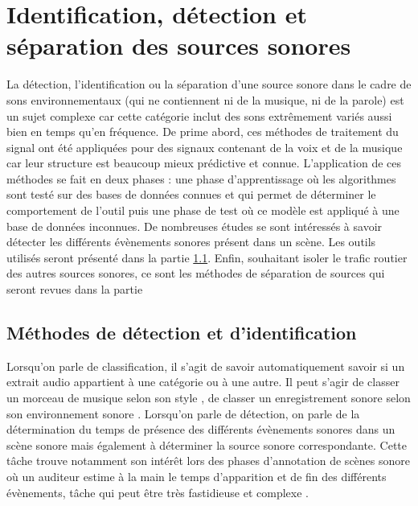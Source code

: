 %
%
%
%
%

\chapter{Identification, détection et séparation des sources sonores}

La détection, l'identification ou la séparation d'une source sonore dans le cadre de sons environnementaux (qui ne contiennent ni de la musique, ni de la parole) est un sujet complexe car cette catégorie inclut des sons extrêmement variés aussi bien en temps qu'en fréquence. De prime abord, ces méthodes de traitement du signal ont été appliquées pour des signaux contenant de la voix et de la musique car leur structure est beaucoup mieux prédictive et connue. L'application de ces méthodes se fait en deux phases : une phase d'apprentissage où les algorithmes sont testé sur des bases de données connues et qui permet de déterminer le comportement de l'outil puis une phase de test où ce modèle est appliqué à une base de données inconnues. De nombreuses études se sont intéressés à savoir détecter les différents évènements sonores présent dans un scène. Les outils utilisés seront présenté dans la partie \ref{sec:ident_detec}. Enfin, souhaitant isoler le trafic routier des autres sources sonores, ce sont les méthodes de séparation de sources qui seront revues dans la partie

\section{Méthodes de détection et d'identification}
\label{sec:ident_detec}

Lorsqu'on parle de classification, il s'agit de savoir automatiquement savoir si un extrait audio appartient à une catégorie ou à une autre. Il peut s'agir de classer un morceau de musique selon son style \cite{tzanetakis_musical_2002}, de classer un enregistrement sonore selon son environnement sonore \cite{chu_where_2006}. Lorsqu'on parle de détection, on parle de la détermination du temps de présence des différents évènements sonores dans un scène sonore mais également à déterminer la source sonore correspondante. Cette tâche trouve notamment son intérêt lors des phases d'annotation de scènes sonore où un auditeur estime à la main le temps d'apparition et de fin des différents évènements, tâche qui peut être très fastidieuse et complexe \cite{mesaros_sound_2015} \cite{cakir_polyphonic_2015}. \\

